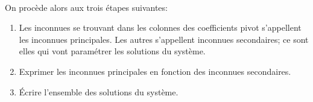 \paragraph{}On procède alors aux trois étapes suivantes:
\begin{enumerate}
  \item Les inconnues se trouvant dans les colonnes des coefficients pivot s'appellent les inconnues principales. Les autres s'appellent inconnues secondaires; ce sont elles qui vont paramétrer les solutions du système.
  \item Exprimer les inconnues principales en fonction des inconnues secondaires.
  \item Écrire l'ensemble des solutions du système.
\end{enumerate}
